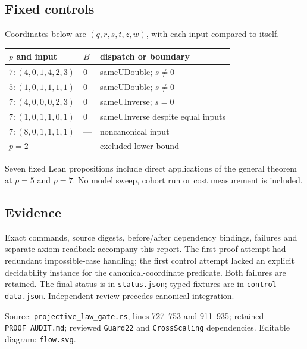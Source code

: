 \documentclass[10pt]{article}
\begin{document}
\subsection*{Fixed controls}
Coordinates below are $(q,r,s,t,z,w)$, with each input compared to itself.
\begin{center}\begin{tabular}{lll}
$p$ and input & $B$ & dispatch or boundary\\\hline
$7:(4,0,1,4,2,3)$ & $0$ & sameUDouble; $s\ne0$\\
$5:(1,0,1,1,1,1)$ & $0$ & sameUDouble; $s\ne0$\\
$7:(4,0,0,0,2,3)$ & $0$ & sameUInverse; $s=0$\\
$7:(1,0,1,1,0,1)$ & $0$ & sameUInverse despite equal inputs\\
$7:(8,0,1,1,1,1)$ & --- & noncanonical input\\
$p=2$ & --- & excluded lower bound
\end{tabular}\end{center}
Seven fixed Lean propositions include direct applications of the general theorem at $p=5$ and $p=7$. No model sweep, cohort run or cost measurement is included.
\subsection*{Evidence}
Exact commands, source digests, before/after dependency bindings, failures and separate axiom readback accompany this report. The first proof attempt had redundant impossible-case handling; the first control attempt lacked an explicit decidability instance for the canonical-coordinate predicate. Both failures are retained. The final status is in \texttt{status.json}; typed fixtures are in \texttt{control-data.json}. Independent review precedes canonical integration.

Source: \texttt{projective\_law\_gate.rs}, lines 727--753 and 911--935; retained \texttt{PROOF\_AUDIT.md}; reviewed \texttt{Guard22} and \texttt{CrossScaling} dependencies. Editable diagram: \texttt{flow.svg}.
\end{document}
